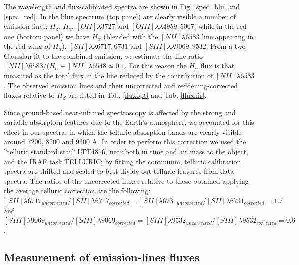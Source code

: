 \documentclass[12pt,preprint]{aastex}
\begin{document}
The wavelength and flux-calibrated spectra are shown in
Fig. \ref{spec_blu} and \ref{spec_red}. In the blue spectrum (top
panel) are clearly visible a number of emission lines: $H_{\beta}$,
$H_{\gamma}$, $[OII]\lambda3727$ and $[OIII]\lambda\lambda4959,5007$,
while in the red one (bottom panel) we have $H_{\alpha}$ (blended with
the $[NII]\lambda6583$ line appearing in the red wing of
$H_{\alpha}$), $[SII]\lambda\lambda6717,6731$ and
$[SIII]\lambda\lambda9069,9532$. From a two-Gaussian fit to the
combined emission, we estimate the line ratio $[NII]\lambda6583
/(H_{\alpha}+[NII]\lambda6548 \simeq 0.1$.  For this reason the
$H_{\alpha}$ flux is that measured as the total flux in the line
reduced by the contribution of $[NII]\lambda6583$. The observed
emission lines and their uncorrected and reddening-corrected fluxes
relative to $H_{\beta}$ are listed in Tab. \ref{fluxopt} and
Tab. \ref{fluxnir}.

Since ground-based near-infrared spectroscopy is affected by the
strong and variable absorption features due to the Earth's atmosphere,
we accounted for this effect in our spectra, in which the telluric
absorption bands are clearly visible around 7200, 8200 and 9300
\AA. In order to perform this correction we used the ''telluric
standard star'' LTT4816, near both in time and air mass to the object,
and the IRAF task TELLURIC; by fitting the continuum, telluric
calibration spectra are shifted and scaled to best divide out telluric
features from data spectra. The ratios of the uncorrected fluxes
relative to those obtained applying the average telluric correction
are the following: $[SII]\lambda 6717_{uncorrected}/ [SII]\lambda
6717_{corrected} = [SII]\lambda 6731_{uncorrected}/ [SII]\lambda
6731_{corrected} = 1.7$ and $[SIII]\lambda 9069_{uncorrected}/
[SIII]\lambda 9069_{corrected} = [SIII]\lambda 9532_{uncorrected}/
[SIII]\lambda 9532_{corrected} = 0.6$.

\subsection{Measurement of emission-lines fluxes}
\end{document}
